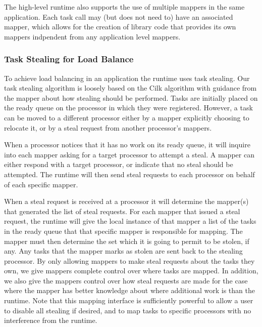 The high-level runtime also supports the use of multiple mappers in the same application.  Each task 
call may (but does not need to) have an associated mapper,
which allows for the creation of library code that provides its own mappers indpendent
from any application level mappers.

\subsubsection{Task Stealing for Load Balance}
\label{subsec:steal}
To achieve load balancing in an application the runtime uses
task stealing.  Our task stealing algorithm is loosely based on the Cilk algorithm
\cite{CILK95} with guidance from the mapper about how stealing should be
performed.  Tasks are initially placed on the ready queue on the processor in which they
were registered.  However, a task can be moved to a different processor either by a mapper
explicitly choosing to relocate it, or by a steal request from another processor's mappers.

When a processor notices that it has no work on its ready queue, it will inquire into each
mapper asking for a target processor to attempt a steal.  A mapper can either respond with
a target processor, or indicate that no steal should be attempted.  The runtime will then
send steal requests to each processor on behalf of each specific mapper.  

When a steal request is received at a processor it will determine the mapper(s) that generated
the list of steal requests.  For each mapper that issued a steal request, the runtime will
give the local instance of that mapper a list of the tasks in the ready queue that that
specific mapper is responsible for mapping.  The mapper must then determine the set which
it is going to permit to be stolen, if any.  Any tasks that the mapper marks as stolen are
sent back to the stealing processor.  By only allowing mappers to make steal requests about
the tasks they own, we give mappers complete control over where tasks are mapped.
In addition, we also give the mappers control over how steal requests are made for
the case where the mapper has better knowledge about where additional work is than the 
runtime.  Note that this mapping interface is sufficiently powerful to allow a user to
disable all stealing if desired, and to map tasks to specific processors with no interference
from the runtime.


